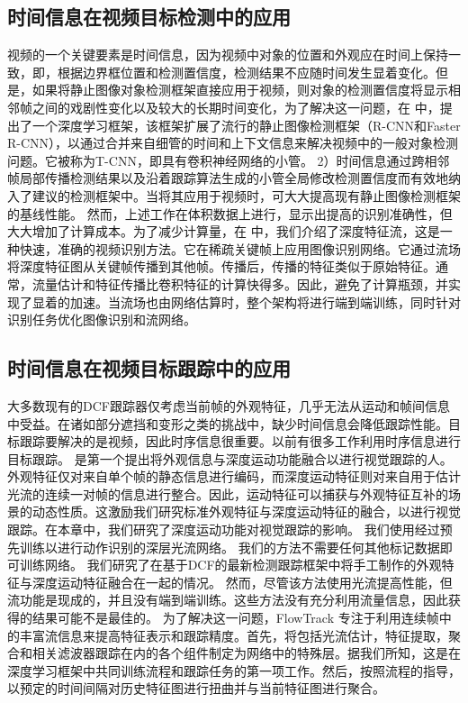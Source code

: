\subsection{时间信息在视频目标检测中的应用}
视频的一个关键要素是时间信息，因为视频中对象的位置和外观应在时间上保持一致，即，根据边界框位置和检测置信度，检测结果不应随时间发生显着变化。但是，如果将静止图像对象检测框架直接应用于视频，则对象的检测置信度将显示相邻帧之间的戏剧性变化以及较大的长期时间变化，为了解决这一问题，在 \cite{TCNN} 中，提出了一个深度学习框架，该框架扩展了流行的静止图像检测框架（R-CNN和Faster R-CNN），以通过合并来自细管的时间和上下文信息来解决视频中的一般对象检测问题。它被称为T-CNN，即具有卷积神经网络的小管。 2）时间信息通过跨相邻帧局部传播检测结果以及沿着跟踪算法生成的小管全局修改检测置信度而有效地纳入了建议的检测框架中。当将其应用于视频时，可大大提高现有静止图像检测框架的基线性能。%
然而，上述工作在体积数据上进行，显示出提高的识别准确性，但大大增加了计算成本。为了减少计算量，在 \cite{DeepFeature} 中，我们介绍了深度特征流，这是一种快速，准确的视频识别方法。它在稀疏关键帧上应用图像识别网络。它通过流场将深度特征图从关键帧传播到其他帧。传播后，传播的特征类似于原始特征。通常，流量估计和特征传播比卷积特征的计算快得多。因此，避免了计算瓶颈，并实现了显着的加速。当流场也由网络估算时，整个架构将进行端到端训练，同时针对识别任务优化图像识别和流网络。%
\subsection{时间信息在视频目标跟踪中的应用}
大多数现有的DCF跟踪器仅考虑当前帧的外观特征，几乎无法从运动和帧间信息中受益。在诸如部分遮挡和变形之类的挑战中，缺少时间信息会降低跟踪性能。目标跟踪要解决的是视频，因此时序信息很重要。以前有很多工作利用时序信息进行目标跟踪。
\cite{DeepMotion} 是第一个提出将外观信息与深度运动功能融合以进行视觉跟踪的人。外观特征仅对来自单个帧的静态信息进行编码，而深度运动特征则对来自用于估计光流的连续一对帧的信息进行整合。因此，运动特征可以捕获与外观特征互补的场景的动态性质。这激励我们研究标准外观特征与深度运动特征的融合，以进行视觉跟踪。在本章中，我们研究了深度运动功能对视觉跟踪的影响。 我们使用经过预先训练以进行动作识别的深层光流网络。 我们的方法不需要任何其他标记数据即可训练网络。 我们研究了在基于DCF的最新检测跟踪框架中将手工制作的外观特征与深度运动特征融合在一起的情况。
然而，尽管该方法使用光流提高性能，但流功能是现成的，并且没有端到端训练。这些方法没有充分利用流量信息，因此获得的结果可能不是最佳的。
为了解决这一问题，FlowTrack \cite{FlowTrack} 专注于利用连续帧中的丰富流信息来提高特征表示和跟踪精度。首先，将包括光流估计，特征提取，聚合和相关滤波器跟踪在内的各个组件制定为网络中的特殊层。据我们所知，这是在深度学习框架中共同训练流程和跟踪任务的第一项工作。然后，按照流程的指导，以预定的时间间隔对历史特征图进行扭曲并与当前特征图进行聚合。

